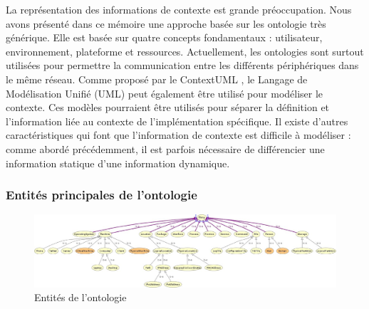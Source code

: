 La représentation des informations de contexte est grande préoccupation. Nous
avons présenté dans ce mémoire une approche basée sur les ontologie très
générique. Elle est basée sur quatre concepts fondamentaux : utilisateur,
environnement, plateforme et ressources. Actuellement, les ontologies sont
surtout utilisées pour permettre la communication entre les différents
périphériques dans le même réseau. Comme proposé par le ContextUML
\cite{sheng_contextuml:_2005}, le Langage de Modélisation Unifié (UML) peut
également être utilisé pour modéliser le contexte. Ces modèles pourraient être
utilisés pour séparer la définition et l'information liée au contexte de
l'implémentation spécifique. Il existe d'autres caractéristiques qui font que
l'information de contexte est difficile à modéliser : comme abordé précédemment,
il est parfois nécessaire de différencier une information statique d'une
information dynamique. 

\subsubsection{Entités principales de l'ontologie}

\begin{figure}[h]
    \centering
    \includegraphics[width=\textwidth]{img/ontology_entities}
    \caption{Entités de l'ontologie}
    \label{fig:ontology_entities}
\end{figure}


